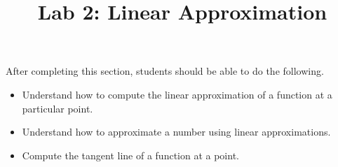\documentclass{ximera}
\title{Lab 2: Linear Approximation}
\begin{document}
\begin{abstract}
\end{abstract}

\maketitle

\begin{sectionOutcomes}

After completing this section, students should be able to do the following.

\begin{itemize}
	\item Understand how to compute the linear approximation of a function at a particular point.
    \item Understand how to approximate a number using linear approximations.
    \item Compute the tangent line of a function at a point.
\end{itemize}

\end{sectionOutcomes}
\end{document}
